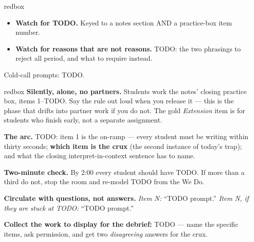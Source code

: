 \documentclass[10pt]{article}
\begin{document}
\boxguard
\begin{skillbox}{redbox}
\begin{itemize}[leftmargin=1.2em, nosep, itemsep=2pt]
  \item \textbf{Watch for TODO.} Keyed to a notes section AND a practice-box item number.
  \item \textbf{Watch for reasons that are not reasons.} TODO: the two phrasings to reject
        all period, and what to require instead.
\end{itemize}
Cold-call prompts: TODO.
\end{skillbox}

\boxguard
\begin{skillbox}{redbox}
\small
\textbf{Silently, alone, no partners.} Students work the notes' closing practice box, items
1--TODO. Say the rule out loud when you release it --- this is the phase that drifts into
partner work if you do not. The gold \emph{Extension} item is for students who finish early,
not a separate assignment.

\vspace{2pt}
\textbf{The arc.} TODO: item 1 is the on-ramp --- every student must be writing within thirty
seconds; \textbf{which item is the crux} (the second instance of today's trap); and what the
closing interpret-in-context sentence has to name.

\vspace{2pt}
\textbf{Two-minute check.} By 2:00 every student should have TODO. If more than a third do not,
stop the room and re-model TODO from the We Do.

\vspace{2pt}
\textbf{Circulate with questions, not answers.} \emph{Item N:} ``TODO prompt.''
\emph{Item N, if they are stuck at TODO:} ``TODO prompt.''

\vspace{2pt}
\textbf{Collect the work to display for the debrief:} TODO --- name the specific items, ask
permission, and get two \emph{disagreeing} answers for the crux.
\end{skillbox}
\end{document}
